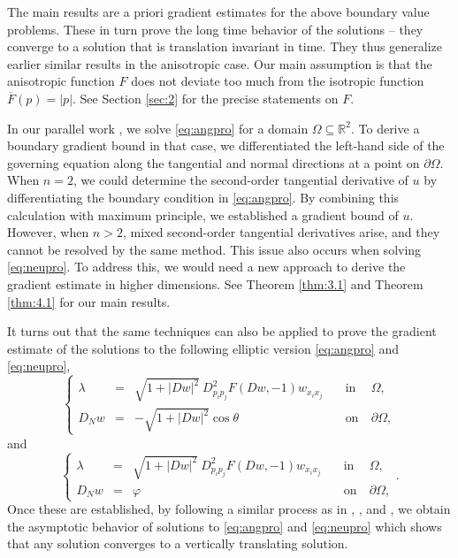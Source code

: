 \documentclass[12pt]{article}
\numberwithin{equation}{section}
\theoremstyle{plain}
\theoremstyle{definition}
\theoremstyle{remark}
\begin{document}
The main results are a priori gradient estimates for the above boundary value problems. 
These in turn prove the long time behavior of the solutions -- they converge to a 
solution that is translation invariant in time. They thus generalize earlier similar results
in the anisotropic case. Our main assumption is that the anisotropic function $F$ does not deviate too much from the isotropic function $\overline{F}(p)=|p|$. See Section \ref{sec:2} for the precise statements on $F$.

In our parallel work \cite{CY1}, we solve \eqref{eq:angpro} for a domain $\Omega \subseteq\mathbb{R}^2$.
To derive a boundary gradient bound in that case, we differentiated the left-hand side of the governing equation along the tangential and normal directions at a point on $\partial\Omega$. When $n=2$, we could determine the second-order tangential derivative of $u$ by differentiating the boundary condition in \eqref{eq:angpro}. By combining this calculation with maximum principle, we established a gradient bound of $u$.
However, when $n>2$, mixed second-order tangential derivatives arise, and they cannot be resolved by the same method. This issue also occurs when solving \eqref{eq:neupro}. To address this, we would need a new approach to derive the gradient estimate in higher dimensions. See Theorem \ref{thm:3.1} and Theorem \ref{thm:4.1} for our main results. 

It turns out that the same techniques can also be applied to prove the gradient estimate of the solutions to the following elliptic version \eqref{eq:angpro} and \eqref{eq:neupro},
\begin{equation} \label{eq:elang_pro}
\left\{ \begin{array}{cllcl}
     \lambda & = & \sqrt{1+|Dw|^2} \ D^2_{p_i p_j} F (Dw,-1) w_{x_i x_j}    
     \quad & \text{in} & \ \Omega,  \\
     D_N w & = & - \sqrt{1+|Dw|^2} \cos \theta \quad & \text{on} & \ \partial \Omega ,
\end{array} \right.
\end{equation}
and 
\begin{equation} \label{eq:elneu_pro}
    \left\{ \begin{array}{cllcl}
           \lambda  & = & \sqrt{1+|Dw|^2} \  D^2_{p_i p_j} F (Dw,-1) w_{x_i x_j}    \quad &  \text{in} &  \ \Omega , \\
            D_N w & = & \varphi  \quad &  \text{on} & \ \partial \Omega ,
    \end{array}  \right..
\end{equation}
Once these are established, by following a similar process as in \cite{AW2}, \cite{GMWW}, and \cite{MWW}, we obtain the asymptotic behavior of solutions to \eqref{eq:angpro} and \eqref{eq:neupro} which shows that
any solution converges to a vertically translating solution.
\end{document}
